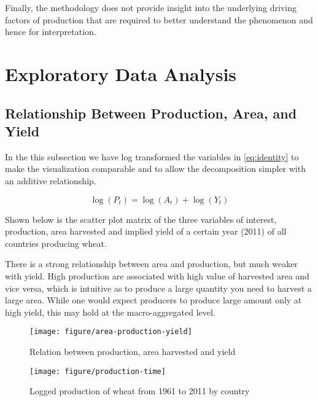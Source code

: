 \documentclass[nojss]{jss}\usepackage[]{graphicx}\usepackage[]{color}
\makeatletter
\def\maxwidth{ %
  \ifdim\Gin@nat@width>\linewidth
    \linewidth
  \else
    \Gin@nat@width
  \fi
}
\newenvironment{knitrout}{}{} %
\makeatother
\begin{document}
Finally, the methodology does not provide insight into the underlying
driving factors of production that are required to better understand
the phenomenon and hence for interpretation.


\section{Exploratory Data Analysis}




\subsection{Relationship Between Production, Area, and Yield}

In the this subsection we have log transformed the variables in
\ref{eq:identity} to make the visualization comparable and to allow
the decomposition simpler with an additive relationship.

\begin{equation}
  \label{eq:logIdentity}
  \log(P_t) = \log(A_t) + \log(Y_t)
\end{equation}

Shown below is the scatter plot matrix of the three variables of
interest, production, area harvested and implied yield of a certain
year (2011) of all countries producing wheat. 

There is a strong relationship between area and production, but much
weaker with yield. High production are associated with high value of
harvested area and vice versa, which is intuitive as to produce a
large quantity you need to harvest a large area. While one would
expect producers to produce large amount only at high yield, this may
hold at the macro-aggregated level.

\begin{knitrout}
\color{fgcolor}\begin{figure}[!ht]


{\centering \texttt{[image: figure/area-production-yield]} 

}

\caption[Relation between production, area harvested and yield]{Relation between production, area harvested and yield\label{fig:area-production-yield}}
\end{figure}


\end{knitrout}


\begin{knitrout}
\color{fgcolor}\begin{figure}[!ht]


{\centering \texttt{[image: figure/production-time]} 

}

\caption[Logged production of wheat from 1961 to 2011 by country]{Logged production of wheat from 1961 to 2011 by country\label{fig:production-time}}
\end{figure}


\end{knitrout}
\end{document}
